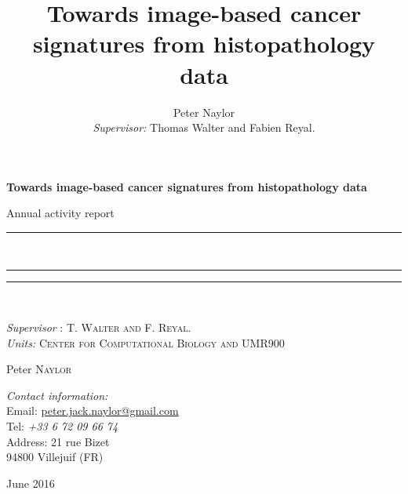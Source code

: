 \documentclass[a4paper,10pt,twocolumn]{article}
\begin{document}
\begin{titlepage}
  \begin{center} \bfseries\Huge
Towards image-based cancer signatures from histopathology data
  \end{center}
  \begin{center} \huge
  Annual activity report
  \end{center}
\begin{center}
\textcolor{mycolor}{\rule{19cm}{0.6pt}}\\
\vspace{0.1cm}
\hrule height 2pt
\vspace{0.1cm}
\textcolor{mycolor}{\rule{19cm}{0.6pt}}\\
\end{center}
   \begin{center}  \large
\textit{Supervisor} : \textsc{T. Walter and F. Reyal}. \\
\textit{Units:} \textsc{Center for Computational Biology and UMR900}
   \end{center}
  \begin{center} \Large
  Peter \textsc{Naylor} \\
  \end{center}
  \begin{flushleft}
  \textit{Contact information:} \\
  \hspace{0.5cm} Email: \url{peter.jack.naylor@gmail.com} \\
  \hspace{0.5cm} Tel: \textit{+33 6 72 09 66 74} \\
  \hspace{0.5cm} Address: 21 rue Bizet \\
  \hspace{0.5cm} \hspace{1.4cm} 94800 Villejuif (FR)
   \end{flushleft}
  \begin{center}  \large
    June 2016
  \end{center}
\end{titlepage}

\title{Towards image-based cancer signatures from histopathology data}


\author{Peter Naylor \\ {\small \textit{Supervisor:} Thomas Walter and Fabien Reyal.}}
\end{document}
